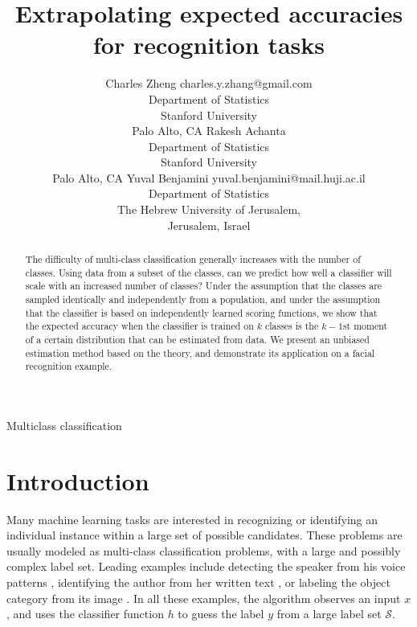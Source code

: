 \documentclass[twoside,11pt]{article}
\begin{document}
\title{Extrapolating expected accuracies for recognition tasks}


\author{\name Charles Zheng \email charles.y.zhang@gmail.com \\
       \addr Department of Statistics\\
       Stanford University\\
       Palo Alto, CA 
       \AND
       \name Rakesh Achanta \email  \\
       \addr Department of Statistics\\
       Stanford University\\
       Palo Alto, CA 
       \AND
       \name Yuval Benjamini \email yuval.benjamini@mail.huji.ac.il \\
       \addr Department of Statistics\\
       The Hebrew University of Jerusalem,\\
       Jerusalem, Israel}

\maketitle

\begin{abstract}%
The difficulty of multi-class classification generally increases with
the number of classes.  Using data from a subset of the classes, can
we predict how well a classifier will scale with an increased number
of classes?  Under the assumption that the classes are sampled
identically and independently from a population, and under the
assumption that the classifier is based on independently learned
scoring functions, we show that the expected accuracy when the
classifier is trained on $k$ classes is the $k-1$st moment of a
certain distribution that can be estimated from data.  We present an
unbiased estimation method based on the theory, and demonstrate its
application on a facial recognition example.
\end{abstract}

\begin{keywords}
Multiclass classification
\end{keywords}
\section{Introduction}\label{sec:recog_tasks}

Many machine learning tasks are interested in recognizing or
identifying an individual instance within a large set of possible
candidates. These problems are usually modeled as multi-class
classification problems, with a large and possibly complex label
set. Leading examples include detecting the speaker from his voice
patterns \citep{togneri2011overview}, identifying the author from her
written text \citep{stamatatos2014overview}, or labeling the object
category from its image
\citep{duygulu2002object,deng2010does,oquab2014learning}.  In all
these examples, the algorithm observes an input $x$, and uses the
classifier function $h$ to guess the label $y$ from a large label set
$\mathcal{S}$.
\end{document}

